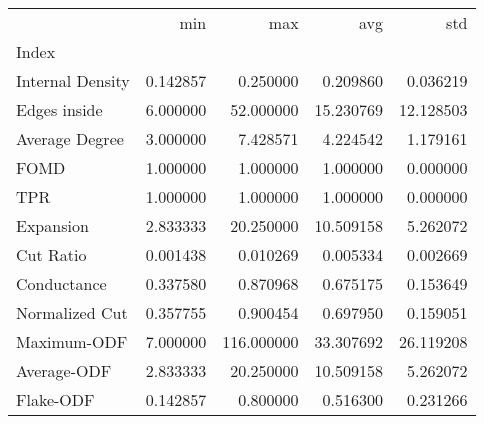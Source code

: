 \begin{tabular}{lrrrr}
\toprule
{} &       min &         max &        avg &        std \\
Index            &           &             &            &            \\
\midrule
Internal Density &  0.142857 &    0.250000 &   0.209860 &   0.036219 \\
Edges inside     &  6.000000 &   52.000000 &  15.230769 &  12.128503 \\
Average Degree   &  3.000000 &    7.428571 &   4.224542 &   1.179161 \\
FOMD             &  1.000000 &    1.000000 &   1.000000 &   0.000000 \\
TPR              &  1.000000 &    1.000000 &   1.000000 &   0.000000 \\
Expansion        &  2.833333 &   20.250000 &  10.509158 &   5.262072 \\
Cut Ratio        &  0.001438 &    0.010269 &   0.005334 &   0.002669 \\
Conductance      &  0.337580 &    0.870968 &   0.675175 &   0.153649 \\
Normalized Cut   &  0.357755 &    0.900454 &   0.697950 &   0.159051 \\
Maximum-ODF      &  7.000000 &  116.000000 &  33.307692 &  26.119208 \\
Average-ODF      &  2.833333 &   20.250000 &  10.509158 &   5.262072 \\
Flake-ODF        &  0.142857 &    0.800000 &   0.516300 &   0.231266 \\
\bottomrule
\end{tabular}
